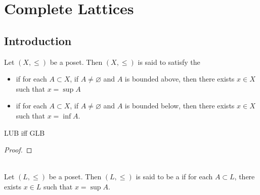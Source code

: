 \documentclass{book}
\begin{document}
	
	
	
	
	
	
	
	
	
	
	
	
	
	
	
	
	\newpage
	\section{Complete Lattices}
	
	\subsection{Introduction}
	
	\begin{defn} 
		Let $(X, \leq)$ be a poset. Then $(X, \leq)$ is said to satisfy the 
		\begin{itemize}
			\item {} if for each $A \subset X$, if $A \neq \varnothing$ and $A$ is bounded above, then there exists $x \in X$ such that $x = \sup A$
			\item {} if for each $A \subset X$, if $A \neq \varnothing$ and $A$ is bounded below, then there exists $x \in X$ such that $x = \inf A$. 
		\end{itemize}
	\end{defn}
	
	\begin{ex}
		LUB iff GLB
	\end{ex}
	
	\begin{proof}
		\tcr{FINISH!!!!}
	\end{proof}
	
	\begin{defn}  \\
		Let $(L, \leq)$ be a poset. Then $(L, \leq)$ is said to be a  if for each $A \subset L$, there exists $x \in L$ such that $x = \sup A$. 
	\end{defn}
	
	
	
	
	
	
	
	
	
	
	
	
	
	
	
	
	
\end{document}
